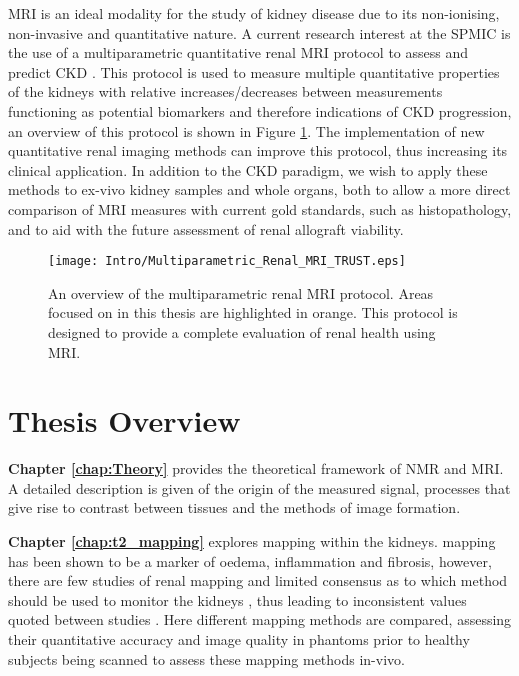 \ac{MRI} is an ideal modality for the study of kidney disease due to its non-ionising, non-invasive and quantitative nature. A current research interest at the \ac{SPMIC} is the use of a multiparametric quantitative renal \ac{MRI} protocol to assess and predict \ac{CKD} \cite{cox_multiparametric_2017,buchanan_quantitative_2019}. This protocol is used to measure multiple quantitative properties of the kidneys with relative increases/decreases between measurements functioning as potential biomarkers and therefore indications of \ac{CKD} progression, an overview of this protocol is shown in Figure \ref{fig:intro_multi_para_overview}. The implementation of new quantitative renal imaging methods can improve this protocol, thus increasing its clinical application. In addition to the \ac{CKD} paradigm, we wish to apply these methods to ex-vivo kidney samples and whole organs, both to allow a more direct comparison of MRI measures with current gold standards, such as histopathology, and to aid with the future assessment of renal allograft viability.

\begin{figure}[H]
	\centering
	\texttt{[image: Intro/Multiparametric\_Renal\_MRI\_TRUST.eps]}
	\caption{An overview of the multiparametric renal \ac{MRI} protocol. Areas focused on in this thesis are highlighted in orange. This protocol is designed to provide a complete evaluation of renal health using \ac{MRI}.}
	\label{fig:intro_multi_para_overview}	
\end{figure}

\newpage

\section{Thesis Overview}
\label{sec:intro_overview}

\textbf{Chapter \ref{chap:Theory}} provides the theoretical framework of \ac{NMR} and \ac{MRI}. A detailed description is given of the origin of the measured signal, processes that give rise to contrast between tissues and the methods of image formation.

\textbf{Chapter \ref{chap:t2_mapping}} explores \ttwo mapping within the kidneys. \ttwo mapping has been shown to be a marker of oedema, inflammation and fibrosis, however, there are few studies of renal \ttwo mapping and limited consensus as to which method should be used to monitor the kidneys \cite{dekkers_consensus-based_2019}, thus leading to inconsistent values quoted between studies \cite{wolf_magnetic_2018}. Here different \ttwo mapping methods are compared, assessing their quantitative accuracy and image quality in phantoms prior to healthy subjects being scanned to assess these \ttwo mapping methods in-vivo.

